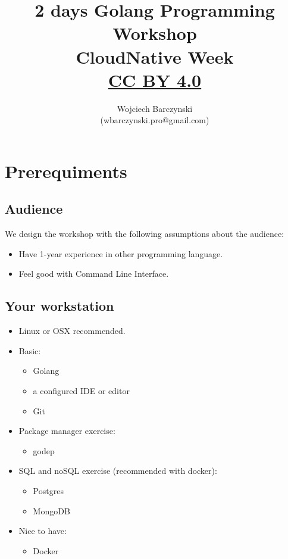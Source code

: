 \documentclass[11pt, letterpaper]{article}
\title{2 days Golang Programming Workshop\\CloudNative Week\\{ \small \href{https://creativecommons.org/licenses/by/4.0/}{CC BY 4.0} }  }
\author{Wojciech Barczynski\\(wbarczynski.pro@gmail.com)}
\date{}
\begin{document}

\begin{titlepage}
\maketitle
\end{titlepage}

\tableofcontents
\pagebreak
\section{Prerequiments}

\subsection{Audience}

We design the workshop with the following assumptions about the audience:

\begin{itemize}%
\item Have 1-year experience in other programming language.%
\item Feel good with Command Line Interface.
\end{itemize}%

\subsection{Your workstation}

\begin{itemize}%
\item Linux or OSX recommended.%
\item Basic: \begin{itemize}%
    \item Golang
    \item a configured IDE or editor
    \item Git
    \end{itemize}%
\item Package manager exercise:
\begin{itemize}%
    \item godep
    \end{itemize}
\item {\small SQL} and no{\small SQL} exercise (recommended with docker):
\begin{itemize}%
    \item Postgres
    \item MongoDB
\end{itemize}
\item Nice to have: \begin{itemize}%
    \item Docker
    \end{itemize}
\end{itemize}
\end{document}
